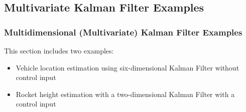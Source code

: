 \subsection{Multivariate Kalman Filter Examples}

\begin{frame}{}
   \frametitle{Multidimensional (Multivariate) Kalman Filter Examples}

   This section includes two examples:
   \begin{itemize}
       \item Vehicle location estimation using six-dimensional Kalman Filter without control input
       \item Rocket height estimation with a two-dimensional Kalman Filter with a control input
   \end{itemize}
\end{frame}

